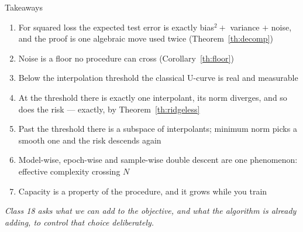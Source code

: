 \documentclass[aspectratio=169, 11pt]{beamer}
\newcommand{\bridge}[1]{%
  {\scriptsize\itshape\color{mcMuted} #1\par}\vspace{0.35em}}
\newcommand{\nosrc}{}       %
\begin{document}
\begin{frame}{Takeaways}
  \nosrc
  \vspace{0.1em}
  {\scriptsize
  \begin{enumerate}\itemsep0.34em
    \item For squared loss the expected test error is exactly
          bias$^2 +$ variance $+$ noise, and the proof is one algebraic
          move used twice (Theorem~\ref{th:decomp})
    \item Noise is a floor no procedure can cross
          (Corollary~\ref{th:floor})
    \item Below the interpolation threshold the classical U-curve is
          real and measurable
    \item At the threshold there is exactly one interpolant, its norm
          diverges, and so does the risk --- exactly, by
          Theorem~\ref{th:ridgeless}
    \item Past the threshold there is a subspace of interpolants;
          minimum norm picks a smooth one and the risk descends again
    \item Model-wise, epoch-wise and sample-wise double descent are one
          phenomenon: effective complexity crossing $N$
    \item Capacity is a property of the procedure, and it grows while
          you train
  \end{enumerate}}
  \bridge{Class 18 asks what we can add to the objective, and what the
  algorithm is already adding, to control that choice deliberately.}
\end{frame}
\end{document}
